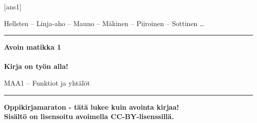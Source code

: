 \documentclass[a4paper,onecolumn,12pt,finnish,oneside,final]{boek3}
\begin{document}
[ans1] %


\begin{titlepage}

  \begin{center}
    \begin{doublespace}
      \begin{LARGE}
        \textrm{Hellsten -- Linja-aho -- Mauno -- Mäkinen -- Piiroinen -- Sottinen \ldots} \\
      \end{LARGE}
      
      \vspace{0.5cm}
      \hrule height 2pt
      \vspace{1cm}
      \begin{Huge}
        \textbf{\textrm{Avoin matikka 1}\\\ \\Kirja on työn alla!}
      \end{Huge}
      
      \vfill
      
      \begin{huge}
        \textrm{MAA1 -- Funktiot ja yhtälöt}
      \end{huge}
      \vspace{1cm}
      \hrule height 2pt
    \end{doublespace}
  \end{center}
  
  \vfill
  \begin{flushright}
    \textbf{Oppikirjamaraton - tätä lukee kuin avointa kirjaa! \\
      Sisältö on lisensoitu avoimella CC-BY-lisenssillä. \\
    }
  \end{flushright}
  
\end{titlepage}

\tableofcontents


\end{document}
